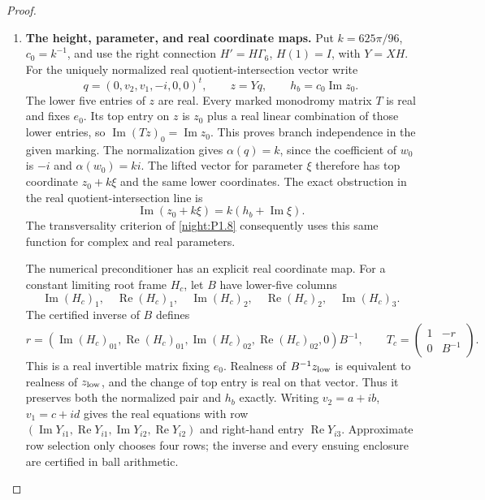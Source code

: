 \begin{proof}\leavevmode\par
\begin{enumerate}[label={$\langle1\rangle$\arabic*.}]
\item \textbf{The height, parameter, and real coordinate maps.}
Put $k=625\pi/96$, $c_0=k^{-1}$, and use the right
connection $H'=H\Gamma_6$, $H(1)=I$, with $Y=XH$.
For the uniquely normalized real quotient-intersection vector write
\[
 q=(0,v_2,v_1,-i,0,0)^t,\qquad z=Yq,
 \qquad h_b=c_0\operatorname{Im}z_0.
\]
The lower five entries of $z$ are real. Every marked monodromy
matrix $T$ is real and fixes $e_0$. Its top entry on $z$ is
$z_0$ plus a real linear combination of those lower entries, so
$\operatorname{Im}(Tz)_0=\operatorname{Im}z_0$. This proves
branch independence in the given marking.
The normalization gives $\alpha(q)=k$, since the coefficient of
$w_0$ is $-i$ and $\alpha(w_0)=ki$. The lifted vector for parameter
$\xi$ therefore has top coordinate $z_0+k\xi$ and the same lower
coordinates. The exact obstruction in the real quotient-intersection
line is
\[
 \operatorname{Im}(z_0+k\xi)=k(h_b+\operatorname{Im}\xi).
\]
The transversality criterion of \cref{night:P1.8} consequently
uses this same function for complex and real parameters.

The numerical preconditioner has an explicit real coordinate map.
For a constant limiting root frame $H_c$, let $B$ have lower-five
columns
\[
 \operatorname{Im}(H_c)_1,\quad\operatorname{Re}(H_c)_1,
 \quad\operatorname{Im}(H_c)_2,\quad\operatorname{Re}(H_c)_2,
 \quad\operatorname{Im}(H_c)_3.
\]
The certified inverse of $B$ defines
\[
 r=(\operatorname{Im}(H_c)_{01},\operatorname{Re}(H_c)_{01},
       \operatorname{Im}(H_c)_{02},\operatorname{Re}(H_c)_{02},0)B^{-1},
 \qquad
 T_c=\begin{pmatrix}1&-r\\0&B^{-1}\end{pmatrix}.
\]
This is a real invertible matrix fixing $e_0$.
Realness of $B^{-1}z_{\rm low}$ is equivalent to realness of
$z_{\rm low}$, and the change of top entry is real on that vector.
Thus it preserves both the normalized pair and $h_b$ exactly.
Writing $v_2=a+ib$, $v_1=c+id$ gives the real equations
with row
$(\operatorname{Im}Y_{i1},\operatorname{Re}Y_{i1},
\operatorname{Im}Y_{i2},\operatorname{Re}Y_{i2})$
and right-hand entry $\operatorname{Re}Y_{i3}$.
Approximate row selection only chooses four rows; the inverse
and every ensuing enclosure are certified in ball arithmetic.


\end{enumerate}
\end{proof}
